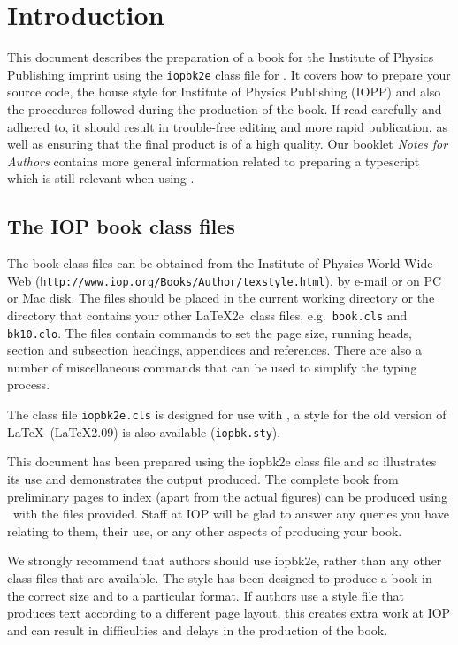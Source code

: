 \documentclass{iopbk2e}
\begin{document}
\chapter{Introduction}
This document describes the preparation of a book for the Institute of 
Physics Publishing imprint
using the \verb"iopbk2e" class file for \LaTeXe.
It covers how to prepare your source code, the house style for 
Institute of Physics Publishing (IOPP) and also the procedures 
followed during the production of the book. 
If read carefully and adhered to, it should
result in trouble-free editing and more rapid publication, as well as 
ensuring that the final product is of a high quality. 
Our booklet {\it Notes for Authors}
contains more general information related to preparing a 
typescript which is still relevant when using \LaTeXe. 

\section{The IOP book class files}
The book class files can be obtained from the Institute of Physics World Wide Web
({\tt http://www.iop.org/Books/Author/texstyle.html}), by e-mail or
on PC or Mac disk.
The files should be placed in the current working directory or the
directory that contains your other
\LaTeX2e\ class files, e.g.\ \verb"book.cls" and \verb"bk10.clo". 
The files  contain commands to 
set the page size, running heads, section and subsection headings, 
appendices and references. There are also a number of miscellaneous 
commands that can be used to simplify the typing process. 

The class file \verb"iopbk2e.cls" 
is designed for use with \LaTeXe, a style for the old version of \LaTeX\
(\LaTeX2.09) is also available (\verb"iopbk.sty"). 

This document has been prepared using the iopbk2e class file 
and so illustrates its use and demonstrates the output produced. 
The complete book from 
preliminary pages to index (apart from the actual figures) can be 
produced using \LaTeXe\ with the files provided. Staff at IOP 
will be glad to answer any queries you have relating to them, 
their use, or any other aspects of producing your book.

We strongly recommend that authors should use iopbk2e, 
rather than any other class files 
that are available. The style has been designed to produce 
a book in the correct size and to a particular format. If authors use a 
style file that produces text according to a different page layout, 
this creates extra work at IOP and can result in 
difficulties and delays in the production of the book.
\end{document}
